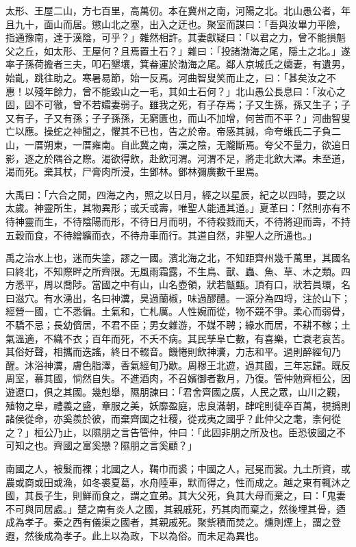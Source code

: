 \begin{pinyinscope}
太形、王屋二山，方七百里，高萬仞。本在冀州之南，河陽之北。北山愚公者，年且九十，面山而居。懲山北之塞，出入之迂也。聚室而謀曰：「吾與汝畢力平險，指通豫南，達于漢陰，可乎？」雜然相許。其妻獻疑曰：「以君之力，曾不能損魁父之丘，如太形、王屋何？且焉置土石？」雜曰：「投諸渤海之尾，隱土之北。」遂率子孫荷擔者三夫，叩石墾壤，箕畚運於渤海之尾。鄰人京城氏之孀妻，有遺男，始齓，跳往助之。寒暑易節，始一反焉。河曲智叟笑而止之，曰：「甚矣汝之不惠！以殘年餘力，曾不能毀山之一毛，其如土石何？」北山愚公長息曰：「汝心之固，固不可徹，曾不若孀妻弱子。雖我之死，有子存焉；子又生孫，孫又生子；子又有子，子又有孫；子子孫孫，无窮匱也，而山不加增，何苦而不平？」河曲智叟亡以應。操蛇之神聞之，懼其不已也，告之於帝。帝感其誠，命夸蛾氏二子負二山，一厝朔東，一厝雍南。自此冀之南，漢之陰，无隴斷焉。夸父不量力，欲追日影，逐之於隅谷之際。渴欲得飲，赴飲河渭。河渭不足，將走北飲大澤。未至道，渴而死。棄其杖，尸膏肉所浸，生鄧林。鄧林彌廣數千里焉。

大禹曰：「六合之閒，四海之內，照之以日月，經之以星辰，紀之以四時，要之以太歲。神靈所生，其物異形；或夭或壽，唯聖人能通其道。」夏革曰：「然則亦有不待神靈而生，不待陰陽而形，不待日月而明，不待殺戮而夭，不待將迎而壽，不持五穀而食，不待繒纊而衣，不待舟車而行。其道自然，非聖人之所通也。」

禹之治水上也，迷而失塗，謬之一國。濱北海之北，不知距齊州幾千萬里，其國名曰終北，不知際畔之所齊限。无風雨霜露，不生鳥、獸、蟲、魚、草、木之類。四方悉平，周以喬陟。當國之中有山，山名壺領，狀若甔甄。頂有口，狀若員環，名曰滋穴。有水湧出，名曰神瀵，臭過蘭椒，味過醪醴。一源分為四埒，注於山下；經營一國，亡不悉徧。土氣和，亡札厲。人性婉而從，物不競不爭。柔心而弱骨，不驕不忌；長幼儕居，不君不臣；男女雜游，不媒不聘；緣水而居，不耕不稼；土氣溫適，不織不衣；百年而死，不夭不病。其民孳阜亡數，有喜樂，亡衰老哀苦。其俗好聲，相攜而迭謠，終日不輟音。饑惓則飲神瀵，力志和平。過則醉經旬乃醒。沐浴神瀵，膚色脂澤，香氣經旬乃歇。周穆王北遊，過其國，三年忘歸。既反周室，慕其國，惝然自失。不進酒肉，不召嬪御者數月，乃復。管仲勉齊桓公，因遊遼口，俱之其國。幾剋舉，隰朋諫曰：「君舍齊國之廣，人民之眾，山川之觀，殖物之阜，禮義之盛，章服之美，妖靡盈庭，忠良滿朝，肆咤則徒卒百萬，視撝則諸侯從命，亦奚羨於彼，而棄齊國之社稷，從戎夷之國乎？此仲父之耄，柰何從之？」桓公乃止，以隰朋之言告管仲，仲曰：「此固非朋之所及也。臣恐彼國之不可知之也。齊國之富奚戀？隰朋之言奚顧？」

南國之人，被髮而裸；北國之人，鞨巾而裘；中國之人，冠冕而裳。九土所資，或農或商或田或漁，如冬裘夏葛，水舟陸車，默而得之，性而成之。越之東有輒沐之國，其長子生，則鮮而食之，謂之宜弟。其大父死，負其大母而棄之，曰：「鬼妻不可與同居處。」楚之南有炎人之國，其親戚死，㱙其肉而棄之，然後埋其骨，迺成為孝子。秦之西有儀渠之國者，其親戚死。聚祡積而焚之。燻則煙上，謂之登遐，然後成為孝子。此上以為政，下以為俗。而未足為異也。


\end{pinyinscope}
